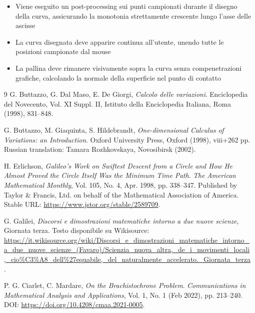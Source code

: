 \documentclass[a4paper,12pt]{article} %
\begin{document}
\begin{itemize}
    \item Viene eseguito un post-processing sui punti campionati durante il disegno della curva, assicurando la monotonia strettamente crescente lungo l'asse delle ascisse
    \item La curva disegnata deve apparire continua all'utente, unendo tutte le posizioni campionate dal mouse
    \item La pallina deve rimanere visivamente sopra la curva senza compenetrazioni grafiche, calcolando la normale della superficie nel punto di contatto
\end{itemize}

\clearpage
{}
{}

\begin{thebibliography}{9}
    G. Buttazzo, G. Dal Maso, E. De Giorgi, \textit{Calcolo delle variazioni}. Enciclopedia del Novecento, Vol. XI Suppl. II, Istituto della Enciclopedia Italiana, Roma (1998), 831--848.
    
    G. Buttazzo, M. Giaquinta, S. Hildebrandt, \textit{One-dimensional Calculus of Variations: an Introduction}. Oxford University Press, Oxford (1998), viii+262 pp. Russian translation: Tamara Rozhkovskaya, Novosibirsk (2002).
    
    H. Erlichson, \textit{Galileo's Work on Swiftest Descent from a Circle and How He Almost Proved the Circle Itself Was the Minimum Time Path}. \textit{The American Mathematical Monthly}, Vol. 105, No. 4, Apr. 1998, pp. 338--347. Published by Taylor \& Francis, Ltd. on behalf of the Mathematical Association of America. Stable URL: \url{https://www.jstor.org/stable/2589709}.
    
    G. Galilei, \textit{Discorsi e dimostrazioni matematiche intorno a due nuove scienze}, Giornata terza. Testo disponibile su Wikisource: \url{https://it.wikisource.org/wiki/Discorsi_e_dimostrazioni_matematiche_intorno_a_due_nuove_scienze_(Favaro)/Scienzia_nuova_altra,_de_i_movimenti_locali,_cio%C3%A8_dell%27equabile,_del_naturalmente_accelerato._Giornata_terza}.

    P. G. Ciarlet, C. Mardare, \textit{On the Brachistochrone Problem}. \textit{Communications in Mathematical Analysis and Applications}, Vol. 1, No. 1 (Feb 2022), pp. 213--240. DOI: \url{https://doi.org/10.4208/cmaa.2021-0005}.
\end{thebibliography}
\end{document}
